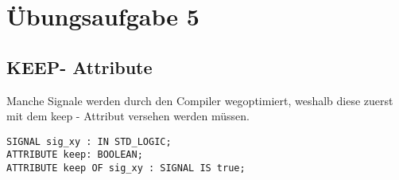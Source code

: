 \documentclass[12pt,a4paper]{article}
\begin{document}
	
\section*{Übungsaufgabe 5}
\subsection*{KEEP- Attribute}
Manche Signale werden durch den Compiler wegoptimiert, weshalb diese zuerst mit dem keep - Attribut versehen werden müssen. 
\begin{lstlisting}[caption=Setzen des keep Attributes]
SIGNAL sig_xy : IN STD_LOGIC;
ATTRIBUTE keep: BOOLEAN;
ATTRIBUTE keep OF sig_xy : SIGNAL IS true;
\end{lstlisting}
\end{document}

